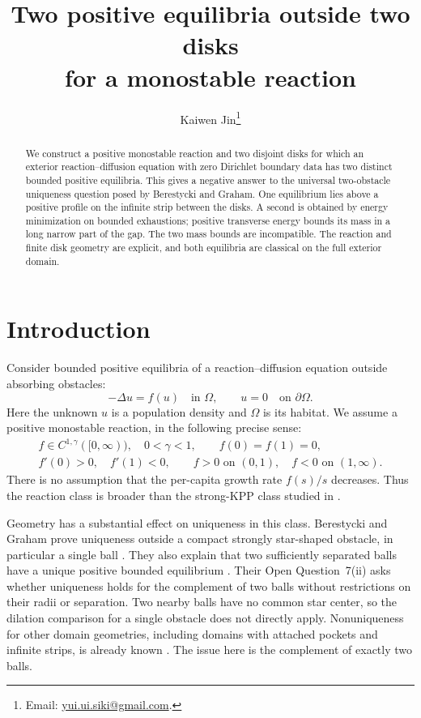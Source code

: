 \documentclass[11pt]{article}
\title{Two positive equilibria outside two disks\\for a monostable reaction}
\author{Kaiwen Jin\thanks{Email: \href{mailto:yui.ui.siki@gmail.com}{yui.ui.siki@gmail.com}.}}
\date{}
\begin{document}
\maketitle
\begin{abstract}
We construct a positive monostable reaction and two disjoint disks for which
an exterior reaction--diffusion equation with zero Dirichlet boundary data
has two distinct bounded positive equilibria. This gives a negative answer
to the universal two-obstacle uniqueness question posed by Berestycki and
Graham. One equilibrium lies above a positive profile on the infinite strip
between the disks. A second is obtained by energy minimization on bounded
exhaustions; positive transverse energy bounds its mass in a long narrow
part of the gap. The two mass bounds are incompatible. The reaction and
finite disk geometry are explicit, and both equilibria are classical on
the full exterior domain.
\end{abstract}
\section{Introduction}

Consider bounded positive equilibria of a reaction--diffusion equation
outside absorbing obstacles:
\begin{equation}\label{eq:problem}
 -\Delta u=f(u)\quad\text{in }\Omega,\qquad
 u=0\quad\text{on }\partial\Omega.
\end{equation}
Here the unknown \(u\) is a population density and \(\Omega\) is its habitat.
We assume a positive monostable reaction, in the following precise sense:
\begin{equation}\label{eq:positive-reaction}
\begin{gathered}
 f\in C^{1,\gamma}([0,\infty)),\quad 0<\gamma<1,\qquad f(0)=f(1)=0,\\
 f'(0)>0,\quad f'(1)<0,\qquad
 f>0\text{ on }(0,1),\quad f<0\text{ on }(1,\infty).
\end{gathered}
\end{equation}
There is no assumption that the per-capita growth rate \(f(s)/s\)
decreases. Thus the reaction class is broader than the strong-KPP class
studied in \cite{BGKPP}.

Geometry has a substantial effect on uniqueness in this class.
Berestycki and Graham prove uniqueness outside a compact strongly
star-shaped obstacle, in particular a single ball
\cite[Theorem~1.1]{BG}.
They also explain that two sufficiently separated balls have a unique
positive bounded equilibrium \cite[Section~8.5]{BG}.
Their Open Question~7(ii) asks whether uniqueness holds for the complement
of two balls without restrictions on their radii or separation.
Two nearby balls have no common star center, so the dilation comparison
for a single obstacle does not directly apply. Nonuniqueness for other
domain geometries, including domains with attached pockets and infinite
strips, is already known \cite[Sections~5--6]{BG}. The issue here is the
complement of exactly two balls.
\end{document}
